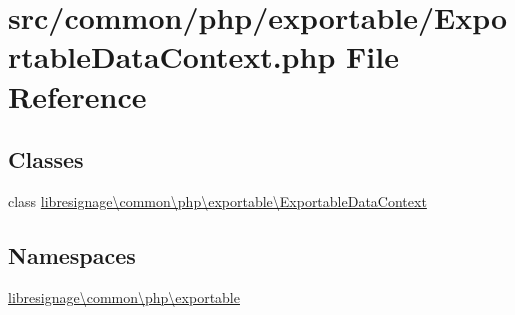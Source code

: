 \hypertarget{ExportableDataContext_8php}{}\section{src/common/php/exportable/\+Exportable\+Data\+Context.php File Reference}
\label{ExportableDataContext_8php}
\subsection*{Classes}
\begin{DoxyCompactItemize}
\item 
class \hyperlink{classlibresignage_1_1common_1_1php_1_1exportable_1_1ExportableDataContext}{libresignage\textbackslash{}common\textbackslash{}php\textbackslash{}exportable\textbackslash{}\+Exportable\+Data\+Context}
\end{DoxyCompactItemize}
\subsection*{Namespaces}
\begin{DoxyCompactItemize}
\item 
 \hyperlink{namespacelibresignage_1_1common_1_1php_1_1exportable}{libresignage\textbackslash{}common\textbackslash{}php\textbackslash{}exportable}
\end{DoxyCompactItemize}
